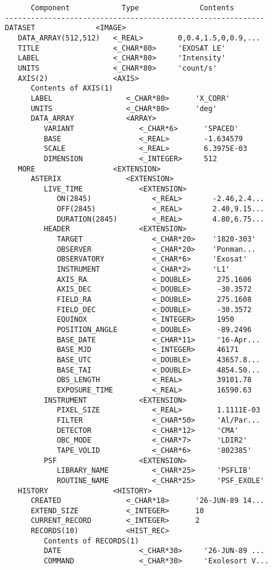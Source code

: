 \begin{verbatim}
      Component            Type              Contents
------------------------------------------------------------
DATASET              <IMAGE>
   DATA_ARRAY(512,512)   <_REAL>        0,0.4,1.5,0,0.9,...  
   TITLE                 <_CHAR*80>     'EXOSAT LE'
   LABEL                 <_CHAR*80>     'Intensity'
   UNITS                 <_CHAR*80>     'count/s'
   AXIS(2)               <AXIS>         
      Contents of AXIS(1)  
      LABEL                 <_CHAR*80>      'X_CORR'  
      UNITS                 <_CHAR*80>      'deg'  
      DATA_ARRAY            <ARRAY>     
         VARIANT               <_CHAR*6>      'SPACED'  
         BASE                  <_REAL>        -1.634579  
         SCALE                 <_REAL>        6.3975E-03  
         DIMENSION             <_INTEGER>     512  
   MORE                  <EXTENSION>             
      ASTERIX               <EXTENSION>             
         LIVE_TIME             <EXTENSION>             
            ON(2845)              <_REAL>       -2.46,2.4...  
            OFF(2845)             <_REAL>       2.40,9.15...  
            DURATION(2845)        <_REAL>       4.80,6.75...  
         HEADER                <EXTENSION>
            TARGET                <_CHAR*20>    '1820-303'
            OBSERVER              <_CHAR*20>    'Ponman...
            OBSERVATORY           <_CHAR*6>     'Exosat'  
            INSTRUMENT            <_CHAR*2>     'L1'  
            AXIS_RA               <_DOUBLE>      275.1606
            AXIS_DEC              <_DOUBLE>      -30.3572
            FIELD_RA              <_DOUBLE>      275.1608
            FIELD_DEC             <_DOUBLE>      -30.3572
            EQUINOX               <_INTEGER>     1950  
            POSITION_ANGLE        <_DOUBLE>      -89.2496
            BASE_DATE             <_CHAR*11>     '16-Apr...  
            BASE_MJD              <_INTEGER>     46171  
            BASE_UTC              <_DOUBLE>      43657.8...
            BASE_TAI              <_DOUBLE>      4854.50...
            OBS_LENGTH            <_REAL>        39101.78  
            EXPOSURE_TIME         <_REAL>        16590.63  
         INSTRUMENT            <EXTENSION>
            PIXEL_SIZE            <_REAL>        1.1111E-03  
            FILTER                <_CHAR*50>     'Al/Par...
            DETECTOR              <_CHAR*12>     'CMA'  
            OBC_MODE              <_CHAR*7>      'LDIR2'  
            TAPE_VOLID            <_CHAR*6>      '802385'  
         PSF                   <EXTENSION>
            LIBRARY_NAME          <_CHAR*25>     'PSFLIB'
            ROUTINE_NAME          <_CHAR*25>     'PSF_EXOLE'  
   HISTORY               <HISTORY>
      CREATED               <_CHAR*18>      '26-JUN-89 14...
      EXTEND_SIZE           <_INTEGER>      10  
      CURRENT_RECORD        <_INTEGER>      2  
      RECORDS(10)           <HIST_REC>
         Contents of RECORDS(1)  
         DATE                  <_CHAR*30>     '26-JUN-89 ...
         COMMAND               <_CHAR*30>     'Exolesort V...
\end{verbatim}

